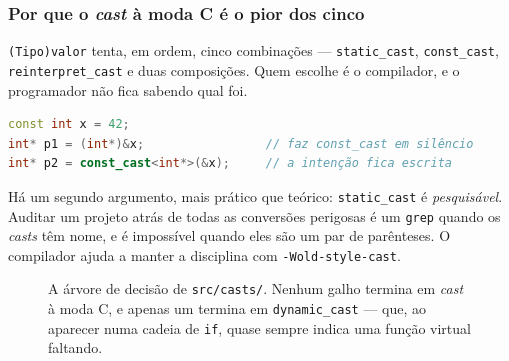 \subsubsection{Por que o \emph{cast} à moda C é o pior dos cinco}

\texttt{(Tipo)valor} tenta, em ordem, cinco combinações --- \texttt{static\_cast},
\texttt{const\_cast}, \texttt{reinterpret\_cast} e duas composições. Quem
escolhe é o compilador, e o programador não fica sabendo qual foi.

\begin{lstlisting}[style=bt, language=C++,
    caption={O mesmo \gls{ub}, uma vez escondido e outra vez visível.}]
const int x = 42;
int* p1 = (int*)&x;                 // faz const_cast em silêncio
int* p2 = const_cast<int*>(&x);     // a intenção fica escrita
\end{lstlisting}

Há um segundo argumento, mais prático que teórico: \texttt{static\_cast} é
\emph{pesquisável}. Auditar um projeto atrás de todas as conversões perigosas é
um \texttt{grep} quando os \emph{casts} têm nome, e é impossível quando eles são
um par de parênteses. O compilador ajuda a manter a disciplina com
\texttt{-Wold-style-cast}.

\begin{figure}[htbp]
\centering
{}
\caption{A árvore de decisão de \texttt{src/casts/}. Nenhum galho termina em
         \emph{cast} à moda C, e apenas um termina em \texttt{dynamic\_cast} ---
         que, ao aparecer numa cadeia de \texttt{if}, quase sempre indica uma
         função virtual faltando.}
\label{fig:arvore-casts}
\end{figure}

